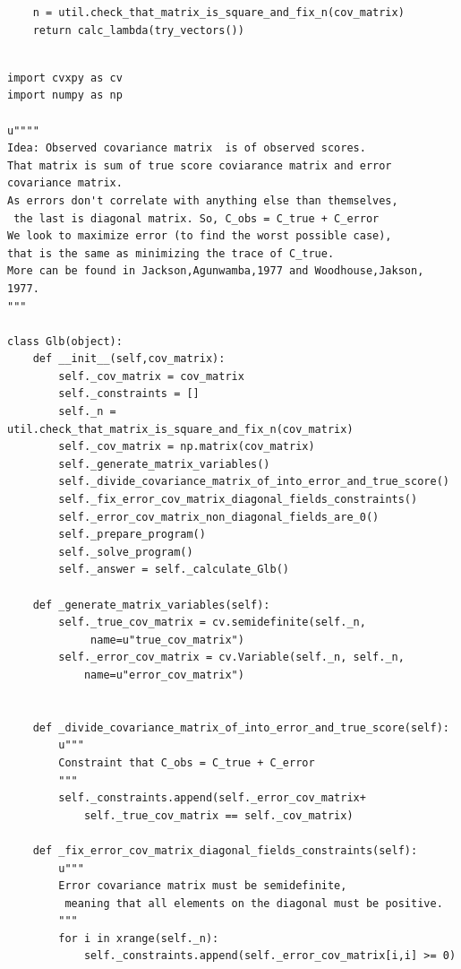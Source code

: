 \documentclass[a4paper,12pt,oneside]{article}
\newenvironment{customFloatWrap}{}{}
\numberwithin{equation}{section}
\theoremstyle{definition}
\begin{document}
\begin{subappendices}
\begin{customFloatWrap}
\begin{verbatim}
    n = util.check_that_matrix_is_square_and_fix_n(cov_matrix)
    return calc_lambda(try_vectors())

\end{verbatim}
\end{customFloatWrap}

\vspace{10pt}

\begin{customFloatWrap}
\begin{verbatim}

import cvxpy as cv
import numpy as np

u""""
Idea: Observed covariance matrix  is of observed scores. 
That matrix is sum of true score coviarance matrix and error covariance matrix.
As errors don't correlate with anything else than themselves,
 the last is diagonal matrix. So, C_obs = C_true + C_error
We look to maximize error (to find the worst possible case), 
that is the same as minimizing the trace of C_true.
More can be found in Jackson,Agunwamba,1977 and Woodhouse,Jakson, 1977.
"""

class Glb(object):
    def __init__(self,cov_matrix):
        self._cov_matrix = cov_matrix
        self._constraints = []
        self._n = util.check_that_matrix_is_square_and_fix_n(cov_matrix)
        self._cov_matrix = np.matrix(cov_matrix)
        self._generate_matrix_variables()
        self._divide_covariance_matrix_of_into_error_and_true_score()
        self._fix_error_cov_matrix_diagonal_fields_constraints()
        self._error_cov_matrix_non_diagonal_fields_are_0()
        self._prepare_program()
        self._solve_program()
        self._answer = self._calculate_Glb()

    def _generate_matrix_variables(self):
        self._true_cov_matrix = cv.semidefinite(self._n,
             name=u"true_cov_matrix")
        self._error_cov_matrix = cv.Variable(self._n, self._n, 
            name=u"error_cov_matrix") 
    
    
    def _divide_covariance_matrix_of_into_error_and_true_score(self):
        u"""
        Constraint that C_obs = C_true + C_error
        """
        self._constraints.append(self._error_cov_matrix+
            self._true_cov_matrix == self._cov_matrix)
        
    def _fix_error_cov_matrix_diagonal_fields_constraints(self):
        u"""
        Error covariance matrix must be semidefinite,
         meaning that all elements on the diagonal must be positive.
        """
        for i in xrange(self._n):
            self._constraints.append(self._error_cov_matrix[i,i] >= 0)


\end{verbatim}
\end{customFloatWrap}
\end{subappendices}
\end{document}
